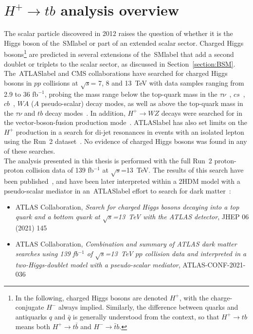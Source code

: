 \chapter{$H^+\to tb$ analysis overview}
\label{chapter:Htbanalysis}

The scalar particle discovered in 2012 raises the question of whether it is the Higgs boson of the~\acrshort{SMlabel} or part of an extended scalar sector. Charged Higgs bosons\footnote{In the following, charged Higgs bosons are denoted $H^+$, with the charge-conjugate $H^-$ always implied. Similarly, the difference between quarks and antiquarks $q$ and $\bar{q}$ is generally understood from the context, so that $H^+\to tb$ means both $H^+\to t\bar{b}$ and $H^-\to \bar{t}b$.} are predicted in several extensions of the~\acrshort{SMlabel} that add a second doublet or triplets to the scalar sector, as discussed in Section~\ref{section:BSM}.\\

The~\acrshort{ATLASlabel} and CMS collaborations have searched for charged Higgs bosons in $pp$ collisions at $\sqrt{s}$= 7, 8 and 13~TeV with data samples ranging from 2.9 to 36 fb$^{-1}$, probing the mass range below the top-quark mass in the $\tau\nu$~\cite{Hplustaunu12,Hplustaunu13,Hplustaunu15,Hplustaunu12CMS,Hplustaunu15CMS,Hplustaunu18}, $cs$~\cite{Hpluscs2013,Hpluscs2015}, $cb$~\cite{HpluscbCMS,Hpluscb2022}, $WA$ ($A$ pseudo-scalar) decay modes, as well as above the top-quark mass in the $\tau\nu$ and $tb$ decay modes~\cite{Hplustaunu12,Hplustaunu13,Hplustaunu15,Hplustaunu12CMS,Hplustaunu18,Hplustb2015,Sirunyan_2020,Hplustb21CMS,ATLASHptb2018}. In addition, $H^+\to WZ$ decays were searched for in the vector-boson-fusion production mode~\cite{HplusWZ15,HplusWZ15CMS}. \acrshort{ATLASlabel} has also set limits on the $H^+$ production in a search for di-jet resonances in events with an isolated lepton using the Run~2 dataset~\cite{Hplusdijet20}. No evidence of charged Higgs bosons was found in any of these searches.\\
    
The analysis presented in this thesis is performed with the full Run~2 proton-proton collision data of 139 fb$^{-1}$ at $\sqrt{s}$=13~TeV. The results of this search have been published~\cite{Hpluspaper}, and have been later interpreted within a 2HDM model with a pseudo-scalar mediator in an~\acrshort{ATLASlabel} effort to search for dark matter~\cite{Hpluscomb}:

\begin{itemize}
    \item ATLAS Collaboration, \textit{Search for charged Higgs bosons decaying into a top quark and a bottom quark at $\sqrt{s}$=13~TeV with the ATLAS detector}, JHEP 06 (2021) 145
    
    \item ATLAS Collaboration, \textit{Combination and summary of ATLAS dark matter searches using 139 fb$^{-1}$ of $\sqrt{s}$=13~TeV $pp$ collision data and interpreted in a two-Higgs-doublet model with a pseudo-scalar mediator}, ATLAS-CONF-2021-036
\end{itemize}

